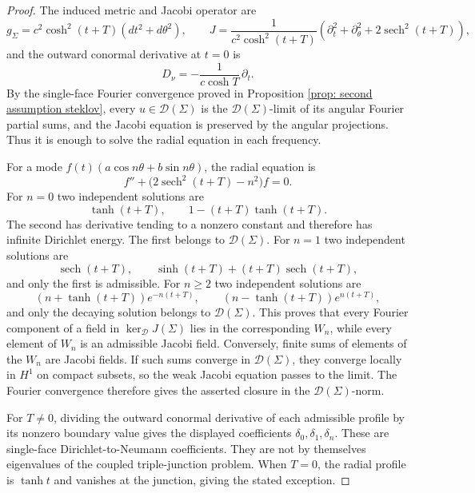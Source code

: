 \documentclass[11pt,twoside]{amsart}
\numberwithin{equation}{section}
\begin{document}
\begin{proof}
The induced metric and Jacobi operator are
\[
g_\Sigma=c^2\cosh^2(t+T)(dt^2+d\theta^2),\qquad
J=\frac1{c^2\cosh^2(t+T)}\left(\partial_t^2+\partial_\theta^2+2\operatorname{sech}^2(t+T)\right),
\]
and the outward conormal derivative at $t=0$ is
\[
D_\nu=-\frac1{c\cosh T}\,\partial_t.
\]
By the single-face Fourier convergence proved in Proposition \ref{prop: second assumption steklov}, every $u\in\mathcal D(\Sigma)$ is the $\mathcal D(\Sigma)$-limit of its angular Fourier partial sums, and the Jacobi equation is preserved by the angular projections. Thus it is enough to solve the radial equation in each frequency.

For a mode $f(t)(a\cos n\theta+b\sin n\theta)$, the radial equation is
\[
f''+\big(2\operatorname{sech}^2(t+T)-n^2\big)f=0.
\]
For $n=0$ two independent solutions are
\[
\tanh(t+T),\qquad 1-(t+T)\tanh(t+T).
\]
The second has derivative tending to a nonzero constant and therefore has infinite Dirichlet energy. The first belongs to $\mathcal D(\Sigma)$. For $n=1$ two independent solutions are
\[
\operatorname{sech}(t+T),\qquad
\sinh(t+T)+(t+T)\operatorname{sech}(t+T),
\]
and only the first is admissible. For $n\ge2$ two independent solutions are
\[
(n+\tanh(t+T))e^{-n(t+T)},\qquad
(n-\tanh(t+T))e^{n(t+T)},
\]
and only the decaying solution belongs to $\mathcal D(\Sigma)$. This proves that every Fourier component of a field in $\ker_{\mathcal D}J(\Sigma)$ lies in the corresponding $W_n$, while every element of $W_n$ is an admissible Jacobi field. Conversely, finite sums of elements of the $W_n$ are Jacobi fields. If such sums converge in $\mathcal D(\Sigma)$, they converge locally in $H^1$ on compact subsets, so the weak Jacobi equation passes to the limit. The Fourier convergence therefore gives the asserted closure in the $\mathcal D(\Sigma)$-norm.

For $T\neq0$, dividing the outward conormal derivative of each admissible profile by its nonzero boundary value gives the displayed coefficients $\delta_0,\delta_1,\delta_n$. These are single-face Dirichlet-to-Neumann coefficients. They are not by themselves eigenvalues of the coupled triple-junction problem. When $T=0$, the radial profile is $\tanh t$ and vanishes at the junction, giving the stated exception.
\end{proof}
\medskip
\end{document}
